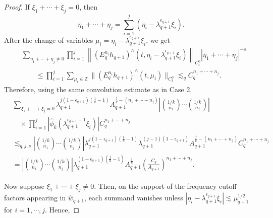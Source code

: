 \documentclass[10pt,a4paper]{amsart}
\newcommand{\Z}{\mathbb Z}
\begin{document}
\begin{proof}
If $\xi_1+\cdots+\xi_j=0$, then
\[
    \eta_1+\cdots+\eta_j
    =
    \sum_{i=1}^j
    \left(\eta_i-\lambda_{q+1}^{\epsilon_{q+1}}\xi_i\right).
\]
After the change of variables $\mu_i=\eta_i-\lambda_{q+1}^{\epsilon_{q+1}}\xi_i$, we get
\[
\begin{aligned}
&\sum_{\eta_1+\cdots+\eta_j\neq0}
\prod_{i=1}^j
\left\|
\left(E_q^{n_i}h_{q+1}\right)^\wedge
\left(t,\eta_i-\lambda_{q+1}^{\epsilon_{q+1}}\xi_i\right)
\right\|_{C_t^0}
|\eta_1+\cdots+\eta_j|^{-s}
\\
&\qquad\le
\prod_{i=1}^j\sum_{\mu_i \in \Z}
\|(E_q^{n_i}h_{q+1})^\wedge(t,\mu_i)\|_{C_t^0}
\lesssim_q
C_q^{n_1+\cdots+n_j}.
\end{aligned}
\]
Therefore, using the same convolution estimate as in Case 2,
\begin{equation}\label{eq:page_29_est}
    \begin{split}
        &\sum_{\xi_1+\cdots+\xi_j=0}
\lambda_{q+1}^{j(1-\epsilon_{q+1})(\frac1k-1)}
A_{q+1}^{\frac jk-(n_1+\cdots+n_j)}
\left|\binom{1/k}{n_1}\cdots\binom{1/k}{n_j}\right|
\\
&\quad\times
\prod_{i=1}^j
\left|
\hat{\phi}_k
\left(\lambda_{q+1}^{\epsilon_{q+1}-1}\xi_i\right)
\right|
C_q^{n_1+\cdots+n_j}
\\
&\lesssim_{q,j,s}
\left|\binom{1/k}{n_1}\cdots\binom{1/k}{n_j}\right|
\lambda_{q+1}^{j(1-\epsilon_{q+1})(\frac1k-1)}
\lambda_{q+1}^{(j-1)(1-\epsilon_{q+1})}
A_{q+1}^{\frac jk-(n_1+\cdots+n_j)}
C_q^{n_1+\cdots+n_j}
\\
&=
\left|\binom{1/k}{n_1}\cdots\binom{1/k}{n_j}\right|
\lambda_{q+1}^{(1-\epsilon_{q+1})(\frac jk-1)}
A_{q+1}^{\frac jk}
\left(\frac{C_q}{A_{q+1}}\right)^{n_1+\cdots+n_j}.
    \end{split}
\end{equation}

Now suppose $\xi_1+\cdots+\xi_j\neq0$. Then, on the support of the frequency cutoff factors appearing in $\hat{w}_{q+1}$, each summand vanishes unless $\left|\eta_i-\lambda_{q+1}^{\epsilon_{q+1}}\xi_i \right| \lesssim \mu_{q+1}^{1/2}$ for $i=1,\cdots,j$. Hence,


\end{proof}
\end{document}
